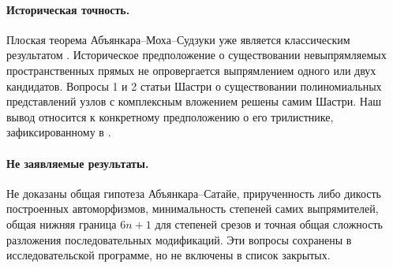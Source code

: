 \paragraph{Историческая точность.}
Плоская теорема Абъянкара--Моха--Судзуки уже является классическим
результатом \cite{AM,Suzuki}. Историческое предположение о существовании
невыпрямляемых пространственных прямых не опровергается выпрямлением
одного или двух кандидатов. Вопросы 1 и 2 статьи Шастри \cite{Shastri}
о существовании полиномиальных представлений узлов с комплексным
вложением решены самим Шастри. Наш вывод относится к конкретному
предположению о его трилистнике, зафиксированному в \cite[с.~1319]{vdER}.

\paragraph{Не заявляемые результаты.}
Не доказаны общая гипотеза Абъянкара--Сатайе, прирученность либо дикость
построенных автоморфизмов, минимальность степеней самих выпрямителей,
общая нижняя граница $6n+1$ для степеней срезов и точная общая сложность
разложения последовательных модификаций. Эти вопросы сохранены в
исследовательской программе, но не включены в список закрытых.
